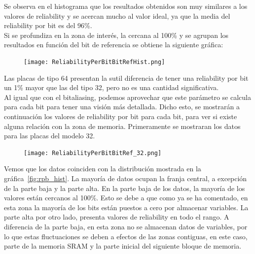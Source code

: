 \documentclass[spanish]{template/minim}
\begin{document}
Se observa en el histograma que los resultados obtenidos son muy similares a los valores de reliability y se acercan mucho al valor ideal, ya que la media del reliability por bit es del 96\%.\\

Si se profundiza en la zona de interés, la cercana al 100\% y se agrupan los resultados en función del bit de referencia se obtiene la siguiente gráfica:

\begin{figure}[H]
    \centering
    \texttt{[image: ReliabilityPerBitBitRefHist.png]}

\end{figure}

Las placas de tipo 64 presentan la sutil diferencia de tener una reliability por bit un 1\% mayor que las del tipo 32, pero no es una cantidad significativa.\\

Al igual que con el bitaliasing, podemos aprovechar que este parámetro se calcula para cada bit para tener una visión más detallada. Dicho esto, se mostrarán a continuación los valores de reliability por bit para cada bit, para ver si existe alguna relación con la zona de memoria. Primeramente se mostraran los datos para las placas del modelo 32.\\

\begin{figure}[H]
    \centering
    \texttt{[image: ReliabilityPerBitBitRef\_32.png]}
\end{figure}

Vemos que los datos coinciden con la distribución mostrada en la gráfica~\ref{fig:rpb_hist}. La mayoría de datos ocupan la franja central, a excepción de la parte baja y la parte alta. En la parte baja de los datos, la mayoría de los valores están cercanos al 100\%. Esto se debe a que como ya se ha comentado, en esta zona la mayoría de los bits están puestos a cero por almacenar variables. La parte alta por otro lado, presenta valores de reliability en todo el rango. A diferencia de la parte baja, en esta zona no se almacenan datos de variables, por lo que estas fluctuaciones se deben a efectos de las zonas contiguas, en este caso, parte de la memoria SRAM y la parte inicial del siguiente bloque de memoria.\\
\end{document}
